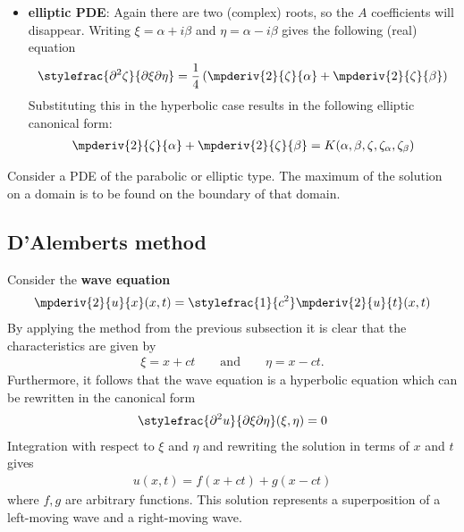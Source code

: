 {\begin{itemize}
\begin{gather}
                    \mpderiv{2}{\zeta}{\eta} = G(\xi,\eta,\zeta,\zeta_\xi,\zeta_\eta)
                \end{gather}
                where $G = \stylefrac{F}{A(\eta_x,\eta_y)}$.
            \item \textbf{elliptic PDE}: Again there are two (complex) roots, so the $A$ coefficients will disappear. Writing $\xi = \alpha + i\beta$ and $\eta = \alpha - i\beta$ gives the following (real) equation \[\stylefrac{\partial^2\zeta}{\partial\xi\partial\eta} = \frac{1}{4}\left(\mpderiv{2}{\zeta}{\alpha} + \mpderiv{2}{\zeta}{\beta}\right)\] Substituting this in the hyperbolic case results in the following elliptic canonical form:
                \begin{gather}
                    \label{pde:elliptic_canonical_form}
                    \mpderiv{2}{\zeta}{\alpha} + \mpderiv{2}{\zeta}{\beta} = K(\alpha,\beta,\zeta,\zeta_\alpha,\zeta_\beta)
                \end{gather}
        \end{itemize}
    }

    \begin{theorem}\label{pde:theorem:maximum_principle}
        Consider a PDE of the parabolic or elliptic type. The maximum of the solution on a domain is to be found on the boundary of that domain.
    \end{theorem}

\subsection{D'Alemberts method}

    Consider the \textbf{wave equation}
    \begin{gather}
        \label{pde:wave_equation}
        \mpderiv{2}{u}{x}(x, t) = \stylefrac{1}{c^2}\mpderiv{2}{u}{t}(x, t)
    \end{gather}
    By applying the method from the previous subsection it is clear that the characteristics are given by
    \begin{gather}
        \xi = x + ct\qquad\text{and}\qquad \eta = x - ct.
    \end{gather}
    Furthermore, it follows that the wave equation is a hyperbolic equation which can be rewritten in the canonical form
    \begin{gather}
        \label{pde:canonical_wave_equation}
        \stylefrac{\partial^2u}{\partial\xi\partial\eta}(\xi,\eta) = 0
    \end{gather}
    Integration with respect to $\xi$ and $\eta$ and rewriting the solution in terms of $x$ and $t$ gives
    \begin{gather}
        \label{pde:wave_solution}
        u(x, t) = f(x+ct) + g(x-ct)
    \end{gather}
    where $f, g$ are arbitrary functions. This solution represents a superposition of a left-moving wave and a right-moving wave.

